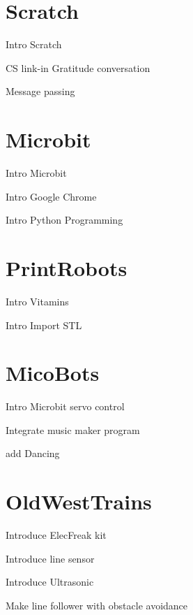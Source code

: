 \documentclass{article}
\def\FithGradeFour{Scratch}
\def\FithGradeFive{Microbit}
\def\FithGradeSix{PrintRobots}
\def\FithGradeSeven{MicoBots}
\def\FithGradeEight{OldWestTrains}
\begin{document}
	\section{\FithGradeFour}
	\begin{todolist}
		\item Intro Scratch
		\item CS link-in Gratitude conversation
		\item Message passing
	\end{todolist}

\section{\FithGradeFive}
\begin{todolist}
	\item Intro Microbit
	\item Intro Google Chrome
	\item Intro Python Programming
\end{todolist}
\section{\FithGradeSix}
\begin{todolist}
	\item Intro Vitamins
	\item Intro Import STL
\end{todolist}
\section{\FithGradeSeven}
\begin{todolist}
	\item Intro Microbit servo control
	\item Integrate music maker program
	\item add Dancing
\end{todolist}
\section{\FithGradeEight}
\begin{todolist}
	\item Introduce ElecFreak kit
	\item Introduce line sensor
	\item Introduce Ultrasonic
	\item Make line follower with obstacle avoidance
\end{todolist}
\newpage
\end{document}
